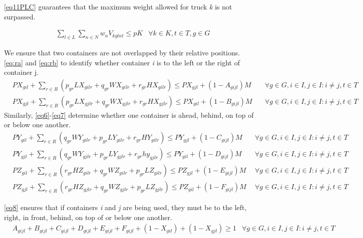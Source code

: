 \eqref{eq11PLC} guarantees that the maximum weight allowed for truck \textit{k} is not surpassed.

\begin{align}
   & \sum_{l\in L}\sum_{n\in N} w_{n}V_{kglnt} \leq pK & \forall k\in K,t\in T, g \in G \label{eq11PLC}
\end{align}




We ensure that two containers are not overlapped by their relative positions.  \eqref{eq:ra} and \eqref{eq:rb} to identify whether container \textit{i} is to the left or the right of container j.
\begin{align}
   & PX_{gil}+\sum_{r \in R} (p_{gr} L X_{gilr}+ q_{gr}WX_{gilr}+ r_{gr}HX_{gilr})  \leq PX_{gjl}+\left(1-A_{g i j l}\right)M \quad & \forall g\in G,  i \in I, j \in I: i \neq j , t \in T
  \label{eq:ra}                                                                                                                                                                             \\
   & PX_{gjl}+\sum_{r \in R} (p_{gr} L X_{gjlr}+ q_{gr}WX_{gjlr} +r_{gr}HX_{gjlr}) \leq PX_{gil}+\left(1-B_{g i j l}\right) M \quad & \forall g\in G,  i \in I, j \in I: i \neq j, t \in T
  \label{eq:rb}
\end{align}
Similarly, \eqref{eq6}-\eqref{eq7} determine whether one container is ahead, behind, on top of or below one another.
\begin{align}
   & PY_{gil}+\sum_{r \in R} (q_{gr} W Y_{gilr}+ p_{gr}LY_{gilr}+r_{gr}HY_{gilr})  \leq PY_{gjl}+\left(1-C_{g i j l}\right) M \quad & \forall g\in G,  i \in I, j \in I: i \neq j , t \in T \label{eq6} \\[0.15cm]
   & PY_{gjl}+\sum_{r \in R} (q_{gr} W Y_{gjlr}+ p_{gr}LY_{gjlr}+r_{gr}hy_{gjlr}) \leq PY_{gil}+\left(1-D_{g i j l}\right) M \quad  & \forall g\in G,  i \in I, j \in I: i \neq j , t \in T
  \\[0.15cm]
   & PZ_{gil}+\sum_{r \in R} (r_{gr} H Z_{gilr} + q_{gr}WZ_{gilr}+ p_{gr} L Z_{gilr}) \leq PZ_{gjl}+\left(1-E_{g i j l}\right) M    & \forall g\in G,  i \in I, j \in I: i \neq j ,t \in T              \\[0.15cm]
   & PZ_{gjl}+\sum_{r \in R} (r_{gr} H Z_{gjlr} +q_{gr}WZ_{gjlr}+ p_{gr} L Z_{gjlr}) \leq PZ_{gil}+\left(1-F_{g i j l}\right) M     & \forall g\in G,  i \in I, j \in I: i \neq j , t \in T \label{eq7}
\end{align}

\eqref{eq8} ensures that if containers \textit{i} and \textit{j} are being used, they must be to the left, right, in front, behind, on top of or below one another.
\begin{align}
   & A_{g i j l}+B_{g i j l}+C_{g i j l}+D_{g i j l}+E_{g i j l}+F_{g i j l}+(1-X_{gil})+(1-X_{gjl}) \geq 1 & \forall g\in G,  i \in I, j \in I: i \neq j,  t \in T  \label{eq8}
\end{align}

